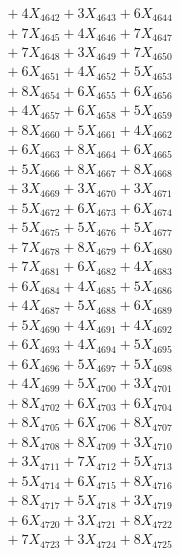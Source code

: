 \documentclass[a4paper,10pt]{article}
\begin{document}
{\begin{align}
&\;  + 4 X_{4642} + 3 X_{4643} + 6 X_{4644} \\[0.3ex]
&\;  + 7 X_{4645} + 4 X_{4646} + 7 X_{4647} \\[0.3ex]
&\;  + 7 X_{4648} + 3 X_{4649} + 7 X_{4650} \\[0.3ex]
&\;  + 6 X_{4651} + 4 X_{4652} + 5 X_{4653} \\[0.3ex]
&\;  + 8 X_{4654} + 6 X_{4655} + 6 X_{4656} \\[0.3ex]
&\;  + 4 X_{4657} + 6 X_{4658} + 5 X_{4659} \\[0.5ex]\allowbreak
&\;  + 8 X_{4660} + 5 X_{4661} + 4 X_{4662} \\[0.3ex]
&\;  + 6 X_{4663} + 8 X_{4664} + 6 X_{4665} \\[0.3ex]
&\;  + 5 X_{4666} + 8 X_{4667} + 8 X_{4668} \\[0.3ex]
&\;  + 3 X_{4669} + 3 X_{4670} + 3 X_{4671} \\[0.3ex]
&\;  + 5 X_{4672} + 6 X_{4673} + 6 X_{4674} \\[0.3ex]
&\;  + 5 X_{4675} + 5 X_{4676} + 5 X_{4677} \\[0.3ex]
&\;  + 7 X_{4678} + 8 X_{4679} + 6 X_{4680} \\[0.3ex]
&\;  + 7 X_{4681} + 6 X_{4682} + 4 X_{4683} \\[0.3ex]
&\;  + 6 X_{4684} + 4 X_{4685} + 5 X_{4686} \\[0.3ex]
&\;  + 4 X_{4687} + 5 X_{4688} + 6 X_{4689} \\[0.5ex]\allowbreak
&\;  + 5 X_{4690} + 4 X_{4691} + 4 X_{4692} \\[0.3ex]
&\;  + 6 X_{4693} + 4 X_{4694} + 5 X_{4695} \\[0.3ex]
&\;  + 6 X_{4696} + 5 X_{4697} + 5 X_{4698} \\[0.3ex]
&\;  + 4 X_{4699} + 5 X_{4700} + 3 X_{4701} \\[0.3ex]
&\;  + 8 X_{4702} + 6 X_{4703} + 6 X_{4704} \\[0.3ex]
&\;  + 8 X_{4705} + 6 X_{4706} + 8 X_{4707} \\[0.3ex]
&\;  + 8 X_{4708} + 8 X_{4709} + 3 X_{4710} \\[0.3ex]
&\;  + 3 X_{4711} + 7 X_{4712} + 5 X_{4713} \\[0.3ex]
&\;  + 5 X_{4714} + 6 X_{4715} + 8 X_{4716} \\[0.3ex]
&\;  + 8 X_{4717} + 5 X_{4718} + 3 X_{4719} \\[0.5ex]\allowbreak
&\;  + 6 X_{4720} + 3 X_{4721} + 8 X_{4722} \\[0.3ex]
&\;  + 7 X_{4723} + 3 X_{4724} + 8 X_{4725} \\[0.3ex]

\end{align}}
\end{document}
